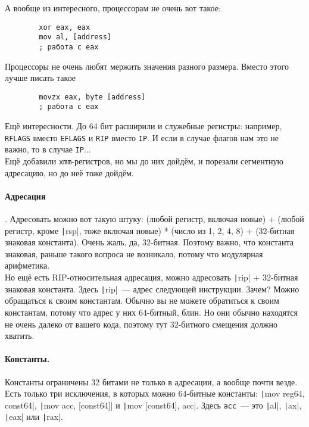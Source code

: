 \documentclass{article}
\begin{document}
    А вообще из интересного, процессорам не очень вот такое:
    \begin{verbatim}
        xor eax, eax
        mov al, [address]
        ; работа с eax
    \end{verbatim}
    Процессоры не очень любят мержить значения разного размера. Вместо этого лучше писать такое
    \begin{verbatim}
        movzx eax, byte [address]
        ; работа с eax
    \end{verbatim}
    Ещё интересности. До 64 бит расширили и служебные регистры: например, \Verb|RFLAGS| вместо \Verb|EFLAGS| и \Verb|RIP| вместо \Verb|IP|. И если в случае флагов нам это не важно, то в случае \Verb|IP|...\\
    Ещё добавили \Verb|xmm|-регистров, но мы до них дойдём, и порезали сегментную адресацию, но до неё тоже дойдём.
    \paragraph{Адресация}.
    Адресовать можно вот такую штуку: (любой регистр, включая новые) + (любой регистр, кроме \texttt|rsp|, тоже включая новые) * (число из 1, 2, 4, 8) + (32-битная знаковая константа). Очень жаль, да, 32-битная. Поэтому важно, что константа знаковая, раньше такого вопроса не возникало, потому что модулярная арифметика.\\
    Но ещё есть RIP-относительная адресация, можно адресовать \texttt|rip| + 32-битная знаковая константа. Здесь \texttt|rip|~--- адрес следующей инструкции. Зачем? Можно обращаться к своим константам. Обычно вы не можете обратиться к своим константам, потому что адрес у них 64-битный, блин. Но они обычно находятся не очень далеко от вашего кода, поэтому тут 32-битного смещения должно хватить.
    \paragraph{Константы.}
    Константы ограничены 32 битами не только в адресации, а вообще почти везде. Есть только три исключения, в которых можно 64-битные константы: \texttt|mov reg64, const64|, \texttt|mov acc, [const64]| и \texttt|mov [const64], acc|. Здесь \Verb|acc|~--- это \texttt|al|, \texttt|ax|, \texttt|eax| или \texttt|rax|.
\end{document}
